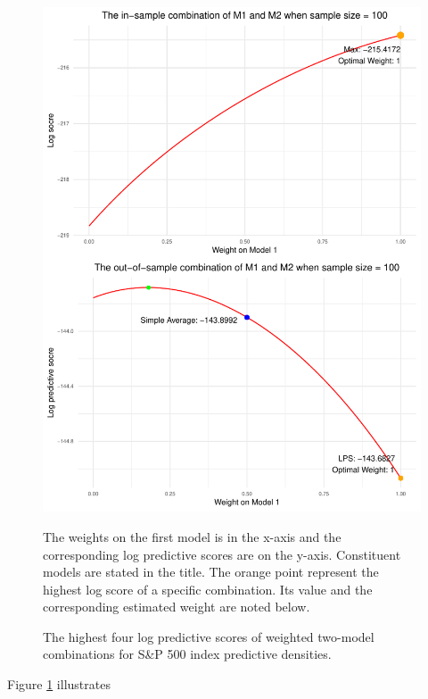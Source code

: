 \documentclass{monashthesis}
\begin{document}
\begin{figure}[ht]
\centering
\caption{The highest four log predictive scores of weighted two-model combinations for S\&P 500 index predictive densities.}
\includegraphics{figures/Sample_Size_100.pdf}
\begin{flushleft}
{\footnotesize The weights on the first model is in the x-axis and the corresponding log predictive scores are on the y-axis. Constituent models are stated in the title. The orange point represent the highest log score of a specific combination. Its value and the corresponding estimated weight are noted below.}\\
\end{flushleft}
\label{fig:ss100}
\end{figure}

Figure \ref{fig:ss100} illustrates
\end{document}
